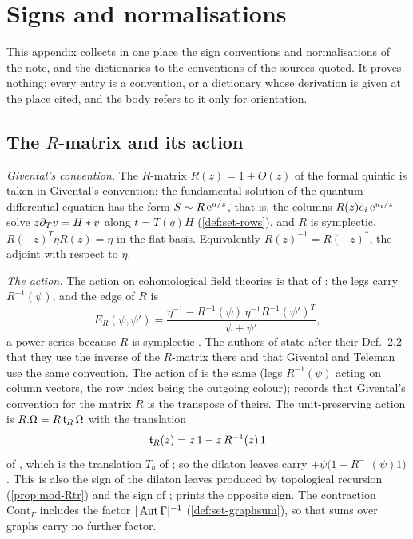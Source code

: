 \section{Signs and normalisations}
\label{sec:sgn}

This appendix collects in one place the sign conventions and normalisations of the note, and the dictionaries to the conventions of the sources quoted. It proves nothing: every entry is a convention, or a dictionary whose derivation is given at the place cited, and the body refers to it only for orientation.

\subsection{The \texorpdfstring{$R$}{R}-matrix and its action}
\label{sec:sgn-R}

\emph{Givental's convention.} The $R$-matrix $R(z)=1+O(z)$ of the formal quintic is taken in Givental's convention: the fundamental solution of the quantum differential equation has the form $S\sim R\,\mathrm{e}^{u/z}$, that is, the columns $R(z)\tilde e_i\,\mathrm{e}^{u_i/z}$ solve $z\partial_Tv=H*v$ along $t=T(q)H$ (\cref{def:set-rows}), and $R$ is symplectic, $R(-z)^T\eta R(z)=\eta$ in the flat basis. Equivalently $R(z)^{-1}=R(-z)^*$, the adjoint with respect to $\eta$.

\emph{The action.} The action on cohomological field theories is that of \cite[Def.~2.2]{PPZ15}: the legs carry $R^{-1}(\psi)$, and the edge of $R$ is
\[
E_R(\psi,\psi')=\frac{\eta^{-1}-R^{-1}(\psi)\,\eta^{-1}R^{-1}(\psi')^T}{\psi+\psi'},
\]
a power series because $R$ is symplectic \cite[Remark~2.1, (6)]{PPZ15}. The authors of \cite{PPZ15} state after their Def.~2.2 that they use the inverse of the $R$-matrix there and that Givental and Teleman use the same convention. The action of \cite[\S2.3]{Dunin-Barkowski:2015caa} is the same (legs $R^{-1}(\psi)$ acting on column vectors, the row index being the outgoing colour); \cite[Remark~2.1]{Dunin-Barkowski:2015caa} records that Givental's convention for the matrix $R$ is the transpose of theirs. The unit-preserving action is $R.\Omega=R\,\mathfrak{t}_R\,\Omega$ with the translation
\[
\mathfrak{t}_R(z)=z\,1-z\,R^{-1}(z)\,1
\]
of \cite[Def.~2.13]{PPZ15}, which is the translation $T_b$ of \cite[Prop.~2.12]{PPZ15}; so the dilaton leaves carry $+\psi\bigl(1-R^{-1}(\psi)1\bigr)$. This is also the sign of the dilaton leaves produced by topological recursion (\cref{prop:mod-Rtr}) and the sign of \cite[\S2.3]{DuninBarkowski:2012bw}; \cite[\S2.3]{Dunin-Barkowski:2015caa} prints the opposite sign. The contraction $\mathrm{Cont}_\Gamma$ includes the factor $|\operatorname{Aut}\Gamma|^{-1}$ (\cref{def:set-graphsum}), so that sums over graphs carry no further factor.

